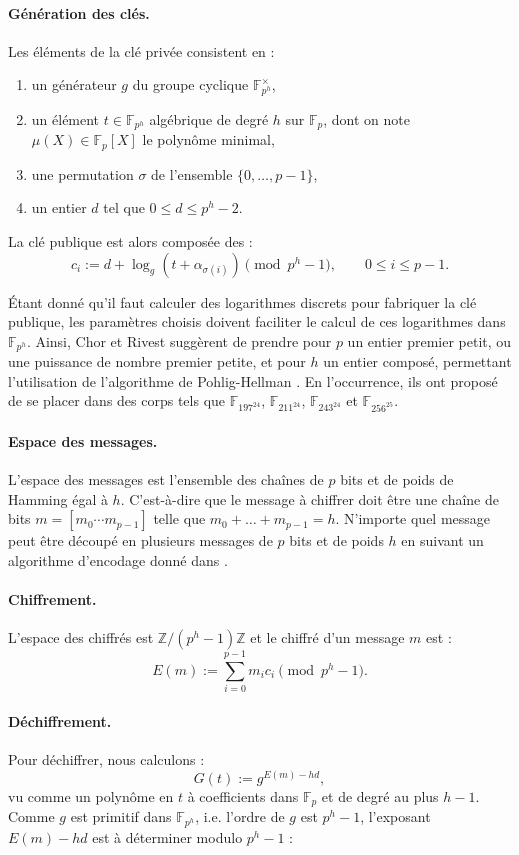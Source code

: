 \documentclass[a4paper, titlepage, 11pt]{article}
\theoremstyle{definition}
\theoremstyle{remark}
\def\Z{\mathbb Z}
\def\gf #1{\mathbb{F}_{#1}}
\begin{document}
\paragraph{Génération des clés.} Les éléments de la clé privée consistent en :
\begin{enumerate}
\item un générateur $g$ du groupe cyclique $\gf{p^h}^\times$,
\item un élément $t \in \gf{p^h}$ algébrique de degré $h$ sur $\gf{p}$, dont on note $\mu(X) \in \gf{p}[X]$ le polynôme minimal,
\item une permutation $\sigma$ de l'ensemble $\{0, \dots, p-1\}$,
\item un entier $d$ tel que $0 \leqslant d \leqslant p^h-2$.
\end{enumerate}
La clé publique est alors composée des :
$$c_i := d + \log_g\left(t + \alpha_{\sigma(i)}\right) \pmod{p^h-1}, \qquad 0 \leqslant i \leqslant p-1.$$

\'Etant donné qu'il faut calculer des logarithmes discrets pour fabriquer la clé publique, les paramètres choisis doivent faciliter le calcul de ces logarithmes dans $\gf{p^h}$. Ainsi, Chor et Rivest suggèrent de prendre pour $p$ un entier premier petit, ou une puissance de nombre premier petite, et pour $h$ un entier composé, permettant l'utilisation de l'algorithme de Pohlig-Hellman \cite{pohligHellman1978}. En l’occurrence, ils ont proposé de se placer dans des corps tels que $\gf{197^{24}}$, $\gf{211^{24}}$, $\gf{243^{24}}$ et $\gf{256^{25}}$.

\paragraph{Espace des messages.}L'espace des messages est l'ensemble des chaînes de $p$ bits et de poids de Hamming égal à $h$. C'est-à-dire que le message à chiffrer doit être une chaîne de bits $m = [m_0\cdots m_{p-1}]$ telle que $m_0+\dots + m_{p-1} = h$. N'importe quel message peut être découpé en plusieurs messages de $p$ bits et de poids $h$ en suivant un algorithme d'encodage donné dans \cite[IV.B.]{chorRivest1988}.

\paragraph{Chiffrement.}L'espace des chiffrés est $\Z/(p^h-1)\Z$ et le chiffré d'un message $m$ est :
$$E(m) := \sum_{i=0}^{p-1} m_ic_i \pmod{p^h-1}.$$
\paragraph{Déchiffrement.}Pour déchiffrer, nous calculons :
$$G(t) := g^{E(m) - hd},$$
vu comme un polynôme en $t$ à coefficients dans $\gf{p}$ et de degré au plus $h-1$. Comme $g$ est primitif dans $\gf{p^h}$, i.e. l'ordre de $g$ est $p^h-1$, l'exposant $E(m) - hd$ est à déterminer modulo $p^h-1$ :
\end{document}
